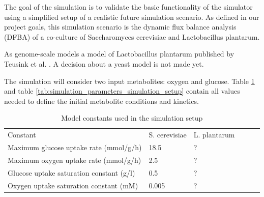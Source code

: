 \documentclass[a4paper,10pt]{article}
\begin{document}

The goal of the simulation is to validate the basic functionality of the simulator using a simplified setup of a realistic future
simulation scenario. As defined in our project goals, this simulation scenario is the dynamic flux balance analysis (DFBA) of a
co-culture of Saccharomyces cerevisiae and Lactobacillus plantarum.

As genome-scale models a model of Lactobacillus plantarum published by Teusink et al. \cite{teusink_analysis_2006}. A decision about
a yeast model is not made yet.

The simulation will consider two input metabolites: oxygen and glucose. Table \ref{tab:model_constants_simulation_setup} and table
\ref{tab:simulation_parameters_simulation_setup} contain all values needed to define the initial metabolite conditions and kinetics.

\begin{table}[h]
\centering
\caption{Model constants used in the simulation setup}
\label{tab:model_constants_simulation_setup}
\begin{tabular}{llllll}
\rowcolor[HTML]{EFEFEF} 
\cellcolor[HTML]{EFEFEF} Constant          & \cellcolor[HTML]{EFEFEF}S. cerevisiae & \cellcolor[HTML]{EFEFEF}L. plantarum\\
Maximum glucose uptake rate (mmol/g/h)     & 18.5 & ? \\
Maximum oxygen uptake rate (mmol/g/h)      & 2.5 & ? \\
Glucose uptake saturation constant (g/l)   & 0.5 & ? \\
Oxygen uptake saturation constant (mM)     & 0.005 & ? \\
\end{tabular}
\end{table}
\end{document}
